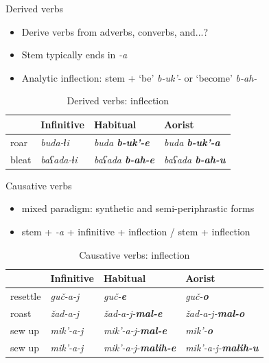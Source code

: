\begin{frame}{Derived verbs}

\begin{itemize}
    \item Derive verbs from adverbs, converbs, and...?
    \item Stem typically ends in \textit{-a}
    \item Analytic inflection: stem + `be' \textit{b-uk'-} or `become' \textit{b-ah-}
\end{itemize}

\begin{table}[]
\caption{Derived verbs: inflection}
\centering
\begin{tabular}{l|l|l|l}
      & Infinitive         & Habitual             & Aorist                 \\ \hline
roar  & \textit{buda-ɬi}   & \textit{buda \textbf{b-uk'-e}}  & \textit{buda \textbf{b-uk'-a}}  \\
bleat & \textit{baʕada-ɬi} & \textit{baʕada \textbf{b-ah-e}} & \textit{baʕada \textbf{b-ah-u}}
\end{tabular}
\end{table}
\end{frame}

\begin{frame}{Causative verbs}
\begin{itemize}
    \item mixed paradigm: synthetic and semi-periphrastic forms
    \item stem + \textit{-a} + infinitive + inflection / stem + inflection
\end{itemize}
\begin{table}[]
\caption{Causative verbs: inflection}
\centering
\begin{tabular}{l|l|l|l}
         & Infinitive        & Habitual                & Aorist                    \\ \hline
resettle & \textit{guč-a-j}  & \textit{guč-\textbf{e}}            & \textit{guč-\textbf{o}}            \\
roast    & \textit{žad-a-j}  & \textit{žad-a-j-\textbf{mal-e}}    & \textit{žad-a-j-\textbf{mal-o}}    \\
sew up   & \textit{mik'-a-j} & \textit{mik'-a-j-\textbf{mal-e}}   & \textit{mik'-\textbf{o}}           \\
sew up   & \textit{mik'-a-j} & \textit{mik'-a-j-\textbf{malih-e}} & \textit{mik'-a-j-\textbf{malih-u}}
\end{tabular}
\end{table}
\end{frame}

